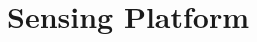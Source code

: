 \documentclass{erauthesis}
\begin{document}


\chapter{Sensing Platform} \label{sensing_platform}
\end{document}
